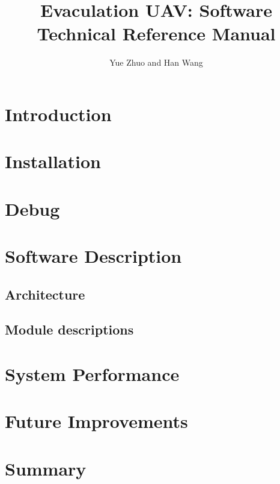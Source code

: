 
\usepackage{graphicx}
\usepackage{subfigure}
\usepackage{enumerate}
\usepackage{threeparttable}
\usepackage[colorlinks,linkcolor=red,anchorcolor=blue,citecolor=green]{hyperref}

\title{Evaculation UAV: Software Technical Reference Manual}

\author{Yue Zhuo and Han Wang}

\large

\maketitle




\section{Introduction}

\section{Installation}

\section{Debug}

\section{Software Description}
\subsection{Architecture}
\subsection{Module descriptions}

\section{System Performance}

\section{Future Improvements}

\section{Summary}




